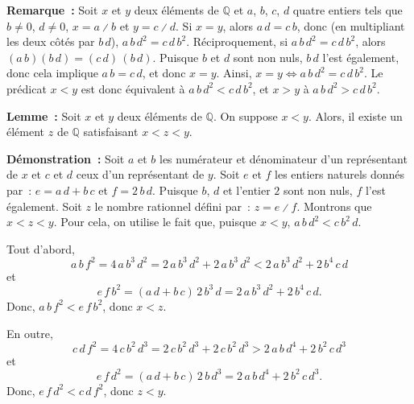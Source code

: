 \noindent\textbf{Remarque :}
    Soit $x$ et $y$ deux éléments de $\mathbb{Q}$ et $a$, $b$, $c$, $d$ quatre entiers tels que $b \neq 0$, $d \neq 0$, $x = a \divslash b$ et $y = c \divslash d$.
    Si $x = y$, alors $a \, d = c \, b$, donc (en multipliant les deux côtés par $b \, d$), $a \, b \, d^2 = c \, d \, b^2$.
    Réciproquement, si $a \, b \, d^2 = c \, d \, b^2$, alors $(a \, b) (b \, d) = (c \, d) \, (b \, d)$.
    Puisque $b$ et $d$ sont non nuls, $b \, d$ l'est également, donc cela implique $a \, b = c \, d$, et donc $x = y$.
    Ainsi, $x = y \Leftrightarrow a \, b \, d^2 = c \, d \, b^2$.
    Le prédicat $x < y$ est donc équivalent à $a \, b \, d^2 < c \, d \, b^2$, et $x > y$ à $a \, b \, d^2 > c \, d \, b^2$.

\medskip

\noindent\textbf{Lemme :} Soit $x$ et $y$ deux éléments de $\mathbb{Q}$. 
    On suppose $x < y$. 
    Alors, il existe un élément $z$ de $\mathbb{Q}$ satisfaisant $x < z < y$. 

\medskip

\noindent\textbf{Démonstration :} Soit $a$ et $b$ les numérateur et dénominateur d'un représentant de $x$ et $c$ et $d$ ceux d'un représentant de $y$. 
    Soit $e$ et $f$ les entiers naturels donnés par : $e = a \, d + b \, c$ et $f = 2 \, b \, d$.
    Puisque $b$, $d$ et l'entier $2$ sont non nuls, $f$ l'est également.
    Soit $z$ le nombre rationnel défini par : $z = e \divslash f$.
    Montrons que $x < z < y$. 
    Pour cela, on utilise le fait que, puisque $x < y$, $a \, b \, d^2 < c \, b^2 \, d$.

    Tout d'abord, 
    \begin{equation*}
        a \, b \, f^2 
        = 4 \, a \, b^3 \, d^2
        = 2 \, a \, b^3 \, d^2 + 2 \, a \, b^3 \, d^2
        < 2 \, a \, b^3 \, d^2 + 2 \, b^4 \, c \, d 
    \end{equation*}
    et 
    \begin{equation*}
        e \, f \, b^2
        = (a \, d + b \, c) \, 2 \, b^3 \, d
        = 2 \, a \, b^3 \, d^2 + 2 \, b^4 \, c \, d. 
    \end{equation*}
    Donc, $a \, b \, f^2 < e \, f \, b^2$, donc $x < z$.

    En outre, 
    \begin{equation*}
        c \, d \, f^2 
        = 4 \, c \, b^2 \, d^3
        = 2 \, c \, b^2 \, d^3 + 2 \, c \, b^2 \, d^3
        > 2 \, a \, b \, d^4 + 2 \, b^2 \, c \, d^3 
    \end{equation*}
    et 
    \begin{equation*}
        e \, f \, d^2
        = (a \, d + b \, c) \, 2 \, b \, d^3
        = 2 \, a \, b \, d^4 + 2 \, b^2 \, c \, d^3. 
    \end{equation*}
    Donc, $e \, f \, d^2 < c \, d \, f^2$, donc $z < y$.


